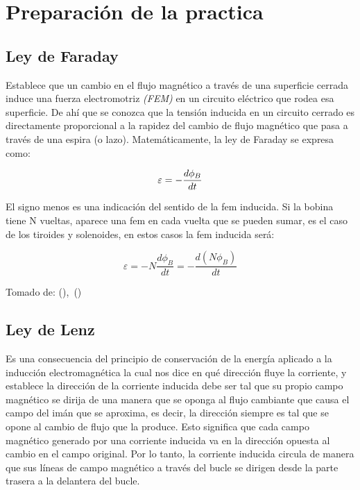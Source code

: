\documentclass[twocolumn, 12pt]{article}
\begin{document}


\section{Preparación de la practica}

\subsection*{Ley de Faraday}

Establece que un cambio en el flujo magnético a través de
una superficie cerrada induce una fuerza electromotriz
\textit{(FEM)} en un circuito eléctrico que rodea esa
superficie. De ahí que se conozca que la tensión inducida
en un circuito cerrado es directamente proporcional a la
rapidez del cambio de flujo magnético que pasa a través de
una espira (o lazo). Matemáticamente, la ley de Faraday se
expresa como:

{\Large
\begin{equation}
	\varepsilon = - \frac{d\phi_B}{dt} \centering
\end{equation}
}

El signo menos es una indicación del sentido de la fem
inducida. Si la bobina tiene N vueltas, aparece una fem en
cada vuelta que se pueden sumar, es el caso de los tiroides
y solenoides, en estos casos la fem inducida será:

{\Large
\begin{equation}
	\varepsilon = - N \frac{d\phi_B}{dt} = - \frac{d(N\phi_B)}{dt}
\end{equation}
}

Tomado de:\hfill \break{}
(\cite{LeyFaraday}),~(\cite{FaradayLawKhanAcademy})

\subsection*{Ley de Lenz}

Es una consecuencia del principio de conservación de la
energía aplicado a la inducción electromagnética la cual
nos dice en qué dirección fluye la corriente, y establece
la dirección de la corriente inducida debe ser tal que su
propio campo magnético se dirija de una manera que se
oponga al flujo cambiante que causa el campo del imán que
se aproxima, es decir, la dirección siempre es tal que se
opone al cambio de flujo que la produce. Esto significa que
cada campo magnético generado por una corriente inducida va
en la dirección opuesta al cambio en el campo original. Por
lo tanto, la corriente inducida circula de manera que sus
líneas de campo magnético a través del bucle se dirigen
desde la parte trasera a la delantera del bucle.
\end{document}
